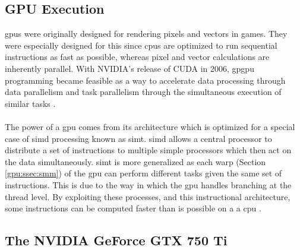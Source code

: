 \subsection{GPU Execution}\label{gpu:sec:opt}
\gls{gpu}s were originally designed for rendering pixels and vectors in games. They were especially designed for this since \gls{cpu}s are optimized to run sequential instructions as fast as possible, whereas pixel and vector calculations are inherently parallel. With NVIDIA's release of CUDA in 2006, \gls{gpgpu} programming became feasible as a way to accelerate data processing through data parallelism and task parallelism through the simultaneous execution of similar tasks \citep{cuda_home}.
\\
\\
The power of a \gls{gpu} comes from its architecture which is optimized for a special case of \gls{simd} processing known as \gls{simt}. \gls{simd} allows a central processor to distribute a set of instructions to multiple simple processors which then act on the data simultaneously. \gls{simt} is more generalized as each warp (Section \ref{gpu:ssec:smm}) of the \gls{gpu} can perform different tasks given the same set of instructions. This is due to the way in which the \gls{gpu} handles branching at the thread level. By exploiting these processes, and this instructional architecture, some instructions can be computed faster than is possible on a  a \gls{cpu} \citep{vuduc2013brief}.
\subsection{The NVIDIA GeForce GTX 750 Ti}\label{gpu:sec:750}
%
